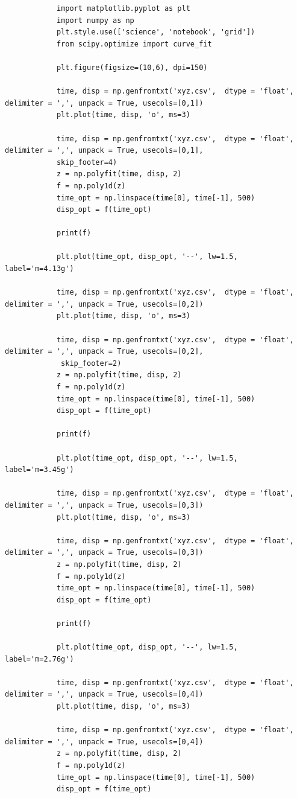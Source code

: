 \documentclass{article}
\begin{document}
		\begin{lstlisting}
			import matplotlib.pyplot as plt
			import numpy as np
			plt.style.use(['science', 'notebook', 'grid'])
			from scipy.optimize import curve_fit
			
			plt.figure(figsize=(10,6), dpi=150)
			
			time, disp = np.genfromtxt('xyz.csv',  dtype = 'float', delimiter = ',', unpack = True, usecols=[0,1])
			plt.plot(time, disp, 'o', ms=3)
			
			time, disp = np.genfromtxt('xyz.csv',  dtype = 'float', delimiter = ',', unpack = True, usecols=[0,1],
			skip_footer=4)
			z = np.polyfit(time, disp, 2)
			f = np.poly1d(z)
			time_opt = np.linspace(time[0], time[-1], 500)
			disp_opt = f(time_opt)
			
			print(f)
			
			plt.plot(time_opt, disp_opt, '--', lw=1.5, label='m=4.13g')
			
			time, disp = np.genfromtxt('xyz.csv',  dtype = 'float', delimiter = ',', unpack = True, usecols=[0,2])
			plt.plot(time, disp, 'o', ms=3)
			
			time, disp = np.genfromtxt('xyz.csv',  dtype = 'float', delimiter = ',', unpack = True, usecols=[0,2],
			 skip_footer=2)
			z = np.polyfit(time, disp, 2)
			f = np.poly1d(z)
			time_opt = np.linspace(time[0], time[-1], 500)
			disp_opt = f(time_opt)
			
			print(f)
			
			plt.plot(time_opt, disp_opt, '--', lw=1.5, label='m=3.45g')
			
			time, disp = np.genfromtxt('xyz.csv',  dtype = 'float', delimiter = ',', unpack = True, usecols=[0,3])
			plt.plot(time, disp, 'o', ms=3)
			
			time, disp = np.genfromtxt('xyz.csv',  dtype = 'float', delimiter = ',', unpack = True, usecols=[0,3])
			z = np.polyfit(time, disp, 2)
			f = np.poly1d(z)
			time_opt = np.linspace(time[0], time[-1], 500)
			disp_opt = f(time_opt)
			
			print(f)
			
			plt.plot(time_opt, disp_opt, '--', lw=1.5, label='m=2.76g')
			
			time, disp = np.genfromtxt('xyz.csv',  dtype = 'float', delimiter = ',', unpack = True, usecols=[0,4])
			plt.plot(time, disp, 'o', ms=3)
			
			time, disp = np.genfromtxt('xyz.csv',  dtype = 'float', delimiter = ',', unpack = True, usecols=[0,4])
			z = np.polyfit(time, disp, 2)
			f = np.poly1d(z)
			time_opt = np.linspace(time[0], time[-1], 500)
			disp_opt = f(time_opt)
			

\end{lstlisting}
\end{document}
